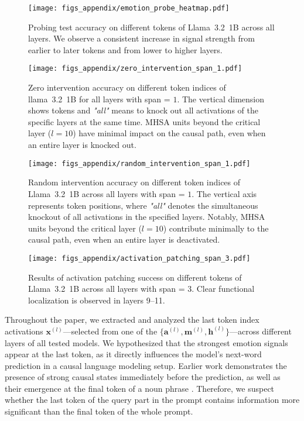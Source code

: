 \begin{figure*}[bht]
    \centering
    \texttt{[image: figs\_appendix/emotion\_probe\_heatmap.pdf]}
  \caption{Probing test accuracy on different tokens of Llama~3.2~1B across all layers. We observe a consistent increase in signal strength from earlier to later tokens and from lower to higher layers.}
  \label{fig:Llama1B_probe_all_tokens}
\end{figure*} 

\begin{figure*}[bht]
    \centering
    \texttt{[image: figs\_appendix/zero\_intervention\_span\_1.pdf]}
  \caption{Zero intervention accuracy on different token indices of llama~3.2~1B for all layers with span = $1$. The vertical dimension shows tokens and \textit{"all"} means to knock out all activations of the specific layers at the same time. MHSA units beyond the critical layer (\( l = 10 \)) have minimal impact on the causal path, even when an entire layer is knocked out.}
  \label{fig:Llama1B_zero_all_tokens}
\end{figure*} 

\begin{figure*}[bht]
    \centering
    \texttt{[image: figs\_appendix/random\_intervention\_span\_1.pdf]}
  \caption{Random intervention accuracy on different token indices of Llama~3.2~1B across all layers with span = $1$. The vertical axis represents token positions, where \textit{"all"} denotes the simultaneous knockout of all activations in the specified layers. Notably, MHSA units beyond the critical layer (\( l = 10 \)) contribute minimally to the causal path, even when an entire layer is deactivated.}
  \label{fig:Llama1B_random_all_tokens}
\end{figure*} 

\begin{figure*}[bht]
    \centering
    \texttt{[image: figs\_appendix/activation\_patching\_span\_3.pdf]}
  \caption{Results of activation patching success on different tokens of Llama~3.2~1B across all layers with span = 3. Clear functional localization is observed in layers 9–11.}
  \label{fig:Llama1B_patching_all_tokens}
\end{figure*} 

Throughout the paper, we extracted and analyzed the last token index activations $\mathbf{x}^{(l)}$---selected from one of the $\{ \mathbf{a}^{(l)}, \mathbf{m}^{(l)}, \mathbf{h}^{(l)} \}$---across different layers of all tested models. We hypothesized that the strongest emotion signals appear at the last token, as it directly influences the model's next-word prediction in a causal language modeling setup. Earlier work demonstrates the presence of strong causal states immediately before the prediction, as well as their emergence at the final token of a noun phrase \cite{meng2022locating}. Therefore, we suspect whether the last token of the query part in the prompt contains information more significant than the final token of the whole prompt.

